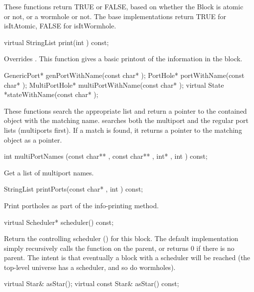 These functions return TRUE or FALSE, based on whether the Block is
atomic or not, or a wormhole or not.  The base implementations return
TRUE for isItAtomic, FALSE for isItWormhole.

\begin{example}
virtual StringList print(int ) const;
\end{example}

Overrides .  This function gives a basic printout of
the information in the block.

\begin{example}
GenericPort* genPortWithName(const char* );
PortHole* portWithName(const char* );
MultiPortHole* multiPortWithName(const char* );
virtual State *stateWithName(const char* );
\end{example}

These functions search the appropriate list and return a pointer
to the contained object with the matching name.  
searches both the multiport and the regular port lists (multiports
first).  If a match is found, it returns a pointer to the matching
object as a  pointer.

\begin{example}
int multiPortNames (const char** , const char** ,
                    int* , int ) const;
\end{example}

Get a list of multiport names.

\begin{example}
StringList printPorts(const char* , int ) const;
\end{example}

Print portholes as part of the info-printing method.

\begin{example}
virtual Scheduler* scheduler() const;
\end{example}

Return the controlling scheduler ()
for this block.  The default
implementation simply recursively calls the  function on the parent, or returns 0
if there is no parent.  The intent is that eventually a block with
a scheduler will be reached (the top-level universe has a scheduler,
and so do wormholes).

\begin{example}
virtual Star& asStar();
virtual const Star& asStar() const;
\end{example}

